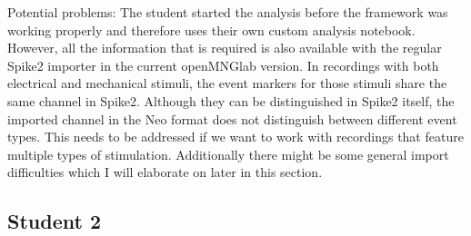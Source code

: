 Potential problems: The student started the analysis before the framework was working properly and therefore uses their own custom analysis notebook. However, all the information that is required is also available with the regular Spike2 importer in the current openMNGlab version.
In recordings with both electrical and mechanical stimuli, the event markers for those stimuli share the same channel in Spike2. Although they can be distinguished in Spike2 itself, the imported channel in the Neo format does not distinguish between different event types. This needs to be addressed if we want to work with recordings that feature multiple types of stimulation.
Additionally there might be some general import difficulties which I will elaborate on later in this section.
 
\subsection{Student 2}


